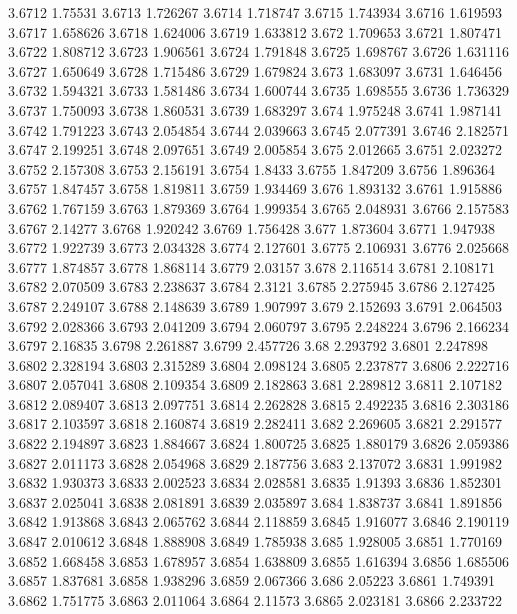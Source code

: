 3.6712  1.75531
3.6713  1.726267
3.6714  1.718747
3.6715  1.743934
3.6716  1.619593
3.6717  1.658626
3.6718  1.624006
3.6719  1.633812
3.672  1.709653
3.6721  1.807471
3.6722  1.808712
3.6723  1.906561
3.6724  1.791848
3.6725  1.698767
3.6726  1.631116
3.6727  1.650649
3.6728  1.715486
3.6729  1.679824
3.673  1.683097
3.6731  1.646456
3.6732  1.594321
3.6733  1.581486
3.6734  1.600744
3.6735  1.698555
3.6736  1.736329
3.6737  1.750093
3.6738  1.860531
3.6739  1.683297
3.674  1.975248
3.6741  1.987141
3.6742  1.791223
3.6743  2.054854
3.6744  2.039663
3.6745  2.077391
3.6746  2.182571
3.6747  2.199251
3.6748  2.097651
3.6749  2.005854
3.675  2.012665
3.6751  2.023272
3.6752  2.157308
3.6753  2.156191
3.6754  1.8433
3.6755  1.847209
3.6756  1.896364
3.6757  1.847457
3.6758  1.819811
3.6759  1.934469
3.676  1.893132
3.6761  1.915886
3.6762  1.767159
3.6763  1.879369
3.6764  1.999354
3.6765  2.048931
3.6766  2.157583
3.6767  2.14277
3.6768  1.920242
3.6769  1.756428
3.677  1.873604
3.6771  1.947938
3.6772  1.922739
3.6773  2.034328
3.6774  2.127601
3.6775  2.106931
3.6776  2.025668
3.6777  1.874857
3.6778  1.868114
3.6779  2.03157
3.678  2.116514
3.6781  2.108171
3.6782  2.070509
3.6783  2.238637
3.6784  2.3121
3.6785  2.275945
3.6786  2.127425
3.6787  2.249107
3.6788  2.148639
3.6789  1.907997
3.679  2.152693
3.6791  2.064503
3.6792  2.028366
3.6793  2.041209
3.6794  2.060797
3.6795  2.248224
3.6796  2.166234
3.6797  2.16835
3.6798  2.261887
3.6799  2.457726
3.68  2.293792
3.6801  2.247898
3.6802  2.328194
3.6803  2.315289
3.6804  2.098124
3.6805  2.237877
3.6806  2.222716
3.6807  2.057041
3.6808  2.109354
3.6809  2.182863
3.681  2.289812
3.6811  2.107182
3.6812  2.089407
3.6813  2.097751
3.6814  2.262828
3.6815  2.492235
3.6816  2.303186
3.6817  2.103597
3.6818  2.160874
3.6819  2.282411
3.682  2.269605
3.6821  2.291577
3.6822  2.194897
3.6823  1.884667
3.6824  1.800725
3.6825  1.880179
3.6826  2.059386
3.6827  2.011173
3.6828  2.054968
3.6829  2.187756
3.683  2.137072
3.6831  1.991982
3.6832  1.930373
3.6833  2.002523
3.6834  2.028581
3.6835  1.91393
3.6836  1.852301
3.6837  2.025041
3.6838  2.081891
3.6839  2.035897
3.684  1.838737
3.6841  1.891856
3.6842  1.913868
3.6843  2.065762
3.6844  2.118859
3.6845  1.916077
3.6846  2.190119
3.6847  2.010612
3.6848  1.888908
3.6849  1.785938
3.685  1.928005
3.6851  1.770169
3.6852  1.668458
3.6853  1.678957
3.6854  1.638809
3.6855  1.616394
3.6856  1.685506
3.6857  1.837681
3.6858  1.938296
3.6859  2.067366
3.686  2.05223
3.6861  1.749391
3.6862  1.751775
3.6863  2.011064
3.6864  2.11573
3.6865  2.023181
3.6866  2.233722
